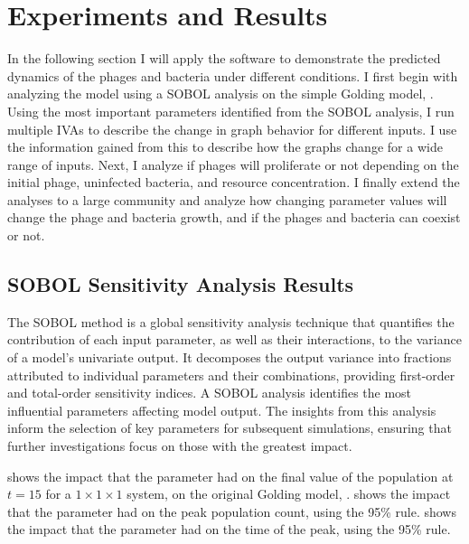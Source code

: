 \chapter{Experiments and Results}
\label{AER}

In the following section I will apply the software to demonstrate the predicted dynamics of the phages and bacteria under different conditions. 
I first begin with analyzing the model using a SOBOL analysis on the simple Golding model, . 
Using the most important parameters identified from the SOBOL analysis, I run multiple IVAs to describe the change in graph behavior for different inputs. 
I use the information gained from this to describe how the graphs change for a wide range of inputs. 
Next, I analyze if phages will proliferate or not depending on the initial phage, uninfected bacteria, and resource concentration. 
I finally extend the analyses to a large community and analyze how changing parameter values will change the phage and bacteria growth, and if the phages and bacteria can coexist or not. 

\section{SOBOL Sensitivity Analysis Results}
\label{sec:SOBOL_sensitivity_analysis_results}
The SOBOL method is a global sensitivity analysis technique that quantifies the contribution of each input parameter, as well as their interactions, to the variance of a model's univariate output. 
It decomposes the output variance into fractions attributed to individual parameters and their combinations, providing first-order and total-order sensitivity indices.
A SOBOL analysis identifies the most influential parameters affecting model output. 
The insights from this analysis inform the selection of key parameters for subsequent simulations, ensuring that further investigations focus on those with the greatest impact.

 shows the impact that the parameter had on the final value of the population at $t=15$ for a $1\times 1\times 1$ system, on the original Golding model, . 
 shows the impact that the parameter had on the peak population count, using the 95\% rule. 
 shows the impact that the parameter had on the time of the peak, using the 95\% rule. 

